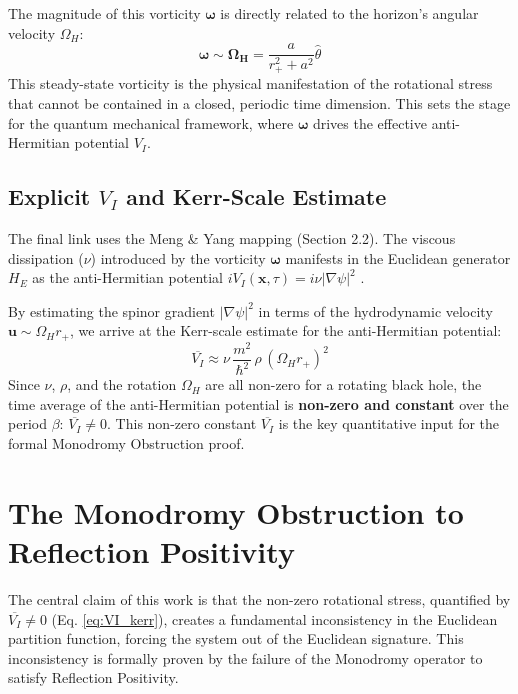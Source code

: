 \documentclass[11pt]{article}
\begin{document}
The magnitude of this vorticity $\mathbf{\omega}$ is directly related to the horizon's angular velocity $\Omega_H$:
\begin{equation}\label{eq:omega_scaling}
    \mathbf{\omega} \sim \mathbf{\Omega_H} = \frac{a}{r_+^2 + a^2} \hat{\theta}
\end{equation}
This steady-state vorticity is the physical manifestation of the rotational stress that cannot be contained in a closed, periodic time dimension. This sets the stage for the quantum mechanical framework, where $\mathbf{\omega}$ drives the effective anti-Hermitian potential $V_I$.

\subsection{Explicit $V_I$ and Kerr-Scale Estimate}

The final link uses the Meng \& Yang mapping (Section 2.2). The viscous dissipation ($\nu$) introduced by the vorticity $\mathbf{\omega}$ manifests in the Euclidean generator $H_E$ as the anti-Hermitian potential $iV_I(\mathbf{x}, \tau) = i\nu|\nabla\psi|^2$ \cite{Explicit VI and Kerr scaling.txt}.

By estimating the spinor gradient $|\nabla\psi|^2$ in terms of the hydrodynamic velocity $\mathbf{u} \sim \Omega_H r_+$, we arrive at the Kerr-scale estimate for the anti-Hermitian potential:
\begin{equation}\label{eq:VI_kerr}
    \overline{V_I} \approx \nu\,\frac{m^2}{\hbar^2}\,\rho\,(\Omega_H r_+)^2
\end{equation}
Since $\nu$, $\rho$, and the rotation $\Omega_H$ are all non-zero for a rotating black hole, the time average of the anti-Hermitian potential is \textbf{non-zero and constant} over the period $\beta$: $\overline{V_I} \neq 0$. This non-zero constant $\overline{V_I}$ is the key quantitative input for the formal Monodromy Obstruction proof.

\section{The Monodromy Obstruction to Reflection Positivity\cite{OsterwalderSchrader1973}}

The central claim of this work is that the non-zero rotational stress, quantified by $\overline{V_I} \neq 0$ (Eq. \ref{eq:VI_kerr}), creates a fundamental inconsistency in the Euclidean partition function, forcing the system out of the Euclidean signature. This inconsistency is formally proven by the failure of the Monodromy operator to satisfy Reflection Positivity\cite{OsterwalderSchrader1973}.
\end{document}
